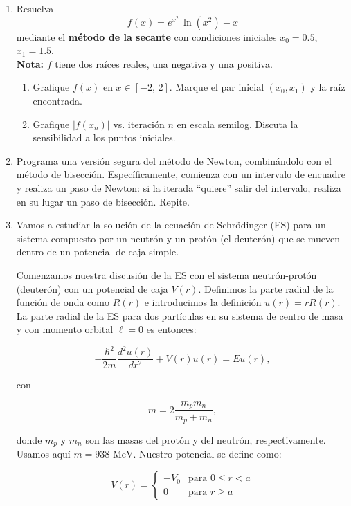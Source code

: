\documentclass[12pt]{article}
\begin{document}
\begin{enumerate}[label=\textbf{\arabic*.}]
\item
Resuelva
\[
f(x) = e^{x^2}\,\ln(x^2) - x 
\]
mediante el \textbf{método de la secante} con condiciones iniciales \(x_0=0.5\), \(x_1=1.5\). \\
\textbf{Nota:} \(f\) tiene dos raíces reales, una negativa y una positiva. \\


\begin{enumerate}
  \item Grafique \(f(x)\) en \(x \in [-2,\,2]\). Marque el par inicial \((x_0,x_1)\) y la raíz encontrada.
  \item Grafique \(|f(x_n)|\) vs. iteración \(n\) en escala semilog. Discuta la sensibilidad a los puntos iniciales.
\end{enumerate}

\item Programa una versión segura del método de Newton, combinándolo con el método de bisección. Específicamente, comienza con un intervalo de encuadre y realiza un paso de Newton: si la iterada ``quiere'' salir del intervalo, realiza en su lugar un paso de bisección. Repite.

\item Vamos a estudiar la solución de la ecuación de Schrödinger (ES) para un sistema compuesto por un neutrón y un protón (el deuterón) que se mueven dentro de un potencial de caja simple.

Comenzamos nuestra discusión de la ES con el sistema neutrón-protón (deuterón) con un potencial de caja $V(r)$. Definimos la parte radial de la función de onda como $R(r)$ e introducimos la definición $u(r) = rR(r)$. La parte radial de la ES para dos partículas en su sistema de centro de masa y con momento orbital $\ell = 0$ es entonces:

\[
-\frac{\hbar^2}{2m} \frac{d^2 u(r)}{dr^2} + V(r)u(r) = Eu(r),
\]

con

\[
m = 2 \frac{m_p m_n}{m_p + m_n},
\]

donde $m_p$ y $m_n$ son las masas del protón y del neutrón, respectivamente. Usamos aquí $m = 938 \text{ MeV}$. Nuestro potencial se define como:

\[
V(r) = \begin{cases}
-V_0 & \text{para } 0 \leq r < a \\
0 & \text{para } r \geq a
\end{cases}
\]


\end{enumerate}
\end{document}
